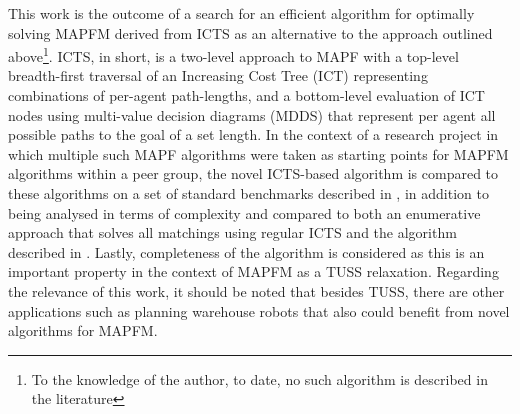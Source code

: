 \documentclass[english]{article}
\begin{document}
This work is the outcome of a search for an efficient algorithm for optimally solving MAPFM derived from ICTS as an alternative to the approach outlined above\footnote{To the knowledge of the author, to date, no such algorithm is described in the literature}. ICTS, in short, is a two-level approach to MAPF with a top-level breadth-first traversal of an Increasing Cost Tree (ICT) representing combinations of per-agent path-lengths, and a bottom-level evaluation of ICT nodes using multi-value decision diagrams (MDDS) that represent per agent all possible paths to the goal of a set length. In the context of a research project in which multiple such MAPF algorithms were taken as starting points for MAPFM algorithms within a peer group, the novel ICTS-based algorithm is compared to these algorithms on a set of standard benchmarks described in \cite{stern2019}, in addition to being analysed in terms of complexity and compared to both an enumerative approach that solves all matchings using regular ICTS and the algorithm described in \cite{ma2016}. Lastly, completeness of the algorithm is considered as this is an important property in the context of MAPFM as a TUSS relaxation. Regarding the relevance of this work, it should be noted that besides TUSS, there are other applications such as planning warehouse robots \cite{wurman2007} that also could benefit from novel algorithms for MAPFM.
\printbibliography
\end{document}
